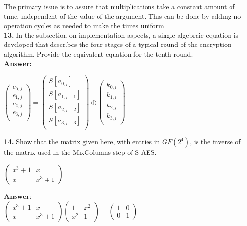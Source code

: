 \documentclass[paper=a4, fontsize=11pt]{scrartcl} %
\numberwithin{equation}{section} %
\numberwithin{figure}{section} %
\numberwithin{table}{section} %
\begin{document}
The primary issue is to assure that multiplications take a constant amount of time, independent of the value of the argument. This can be done by adding no-operation cycles as needed to make the times uniform.\\

\textbf{13.} In the subsection on implementation aspects, a single algebraic equation is developed that describes the four stages of a typical round of the encryption algorithm. Provide the equivalent equation for the tenth round.\\

\textbf{Answer:}
\begin{center}

$\begin{pmatrix}
e_{0,j}\\
e_{1,j}\\
e_{2,j}\\
e_{3,j}\\
\end{pmatrix}=
\begin{pmatrix}
S{[a_{0,j}]}\\
S{[a_{1,j-1}]}\\
S{[a_{2,j-2}]}\\
S{[a_{3,j-3}]}\\
\end{pmatrix}\oplus
\begin{pmatrix}
k_{0,j}\\
k_{1,j}\\
k_{2,j}\\
k_{3,j}\\
\end{pmatrix}$

\end{center}


\textbf{14.} Show that the matrix given here, with entries in $GF(2^{4})$, is the inverse of the matrix used in the MixColumns step of S-AES.
\begin{center}
$\begin{pmatrix}
x^{3}+1 & x\\
x & x^{3}+1
\end{pmatrix}$
\end{center}

\textbf{Answer:}\\

$\begin{pmatrix}
x^{3}+1 & x\\
x & x^{3}+1
\end{pmatrix}
\begin{pmatrix}
1 & x^{2}\\
x^{2} & 1
\end{pmatrix}=
\begin{pmatrix}
1 & 0\\
0 & 1
\end{pmatrix}
$\\
\end{document}
